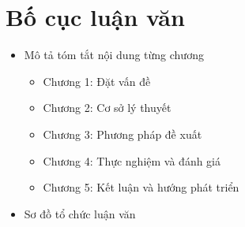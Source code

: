 \section{Bố cục luận văn}
\begin{itemize}
    \item Mô tả tóm tắt nội dung từng chương
    \begin{itemize}
        \item Chương 1: Đặt vấn đề
        \item Chương 2: Cơ sở lý thuyết
        \item Chương 3: Phương pháp đề xuất
        \item Chương 4: Thực nghiệm và đánh giá
        \item Chương 5: Kết luận và hướng phát triển
    \end{itemize}
    \item Sơ đồ tổ chức luận văn
\end{itemize}
